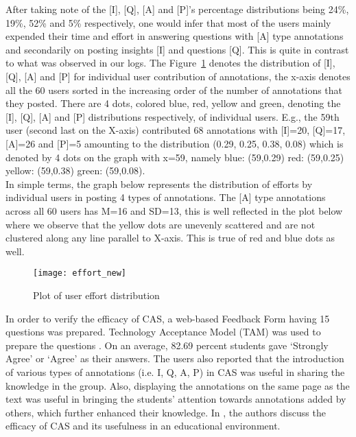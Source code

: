 \documentclass{llncs}
\begin{document}
After taking note of the [I], [Q], [A] and [P]’s percentage distributions being 24\%, 19\%, 52\% and 5\% respectively, one would infer that most of the users mainly expended their time and effort in answering questions with [A] type annotations and secondarily on posting insights [I] and questions [Q]. This is quite in contrast to what was observed in our logs. The Figure~\ref{fig:Effort} denotes the distribution of [I], [Q], [A] and [P] for individual user contribution of annotations, the x-axis denotes all the 60 users sorted in the increasing order of the number of annotations that they posted. There are 4 dots, colored blue, red, yellow and green, denoting the [I], [Q], [A] and [P] distributions respectively, of individual users. E.g., the 59th user (second last on the X-axis) contributed 68 annotations with [I]=20, [Q]=17, [A]=26 and [P]=5 amounting to the distribution (0.29, 0.25, 0.38, 0.08) which is denoted by 4 dots on the graph with x=59, namely blue: (59,0.29) red: (59,0.25) yellow: (59,0.38) green: (59,0.08). \\

In simple terms, the graph below represents the distribution of efforts by individual users in posting 4 types of annotations. The [A] type annotations across all 60 users has M=16 and SD=13, this is well reflected in the plot below where we observe that the yellow dots are unevenly scattered and are not clustered along any line parallel to X-axis. This is true of red and blue dots as well.

\begin{figure}
\centering
\texttt{[image: effort\_new]}
\caption{Plot of user effort distribution}
\label{fig:Effort}
\end{figure}

In order to verify the efficacy of CAS, a web-based Feedback Form having 15 questions was prepared. Technology Acceptance Model (TAM) was used to prepare the questions \cite{davis1989perceived}.  On an average, 82.69 percent students gave `Strongly Agree' or `Agree' as their answers. The users also reported that the introduction of various types of annotations (i.e. I, Q, A, P) in CAS was useful in sharing the knowledge in the group. Also, displaying the annotations on the same page as the text was useful in bringing the students' attention towards annotations added by others, which further enhanced their knowledge. In \cite{chhabra2015framework}, the authors discuss the efficacy of CAS and its usefulness in an educational environment. 
\end{document}
